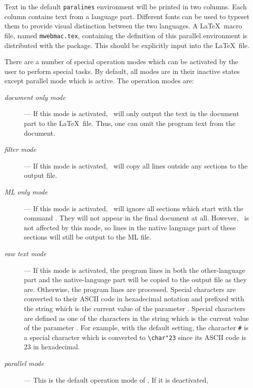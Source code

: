 Text in the default {\tt paralines} environment will be printed in two
columns. Each column contains text from a language part. Different
fonts can be used to typeset them to provide visual distinction between
the two languages. 
A \LaTeX\ macro file, named {\tt mwebmac.tex}, containing the definition of 
this parallel environment is distributed with the package. This should
be explicitly input into the \LaTeX\ file.

There are a number of special operation modes which can be activated
by the user to perform special tasks. By default, all modes are in
their inactive states except parallel mode which is active. The
operation modes are: 
\begin{description}
\item[{\it document only mode}]--- 
If this mode is activated, \weave\ will only output the text in the
document part to the \LaTeX\ file. Thus, one can omit the program text
from the document. 
\item[{\it filter mode}]--- 
If this mode is activated, \weave\ will copy all lines outside any
sections to the output file.
\item[{\it ML only mode}]--- 
If this mode is activated, \weave\ will ignore all sections which
start with the command . They will not appear in
the final document at all. However, \tangle\ is
not affected by this mode, so lines in the native language part of
these sections will still be output to the ML file.
\item[{\it raw text mode}]--- 
If this mode is activated, the program lines in both the other-language
part and the native-language part will be copied to the output file as
they are. Otherwise, the program lines are processed. Special characters
are converted to their ASCII code in hexadecimal notation and prefixed with the
string which is the current value of the parameter
. Special characters are defined as one of the
characters in the string which is the current value of the parameter
. For example, with the default setting, the
character \verb|#| is a special character which is converted to
\verb|\char"23| since its ASCII code is 23 in hexadecimal.
\item[{\it parallel mode}]--- 
This is the default operation mode of \weave. If it is deactivated,

\end{description}
